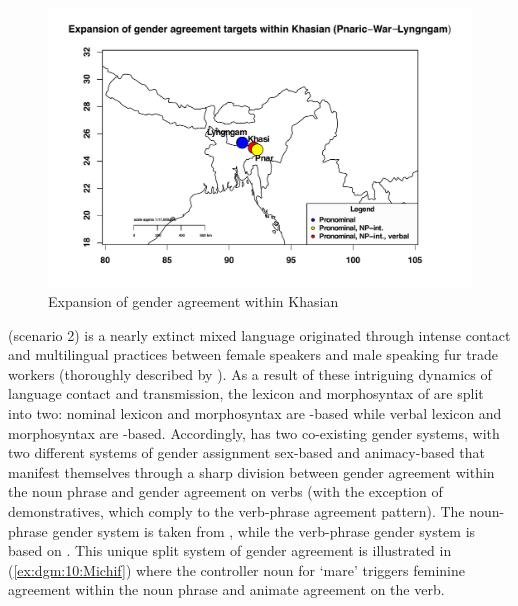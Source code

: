 \documentclass[output=collectionpaper]{langsci/langscibook}
\begin{document}
\begin{figure}
\includegraphics[height=.5\textheight]{figures/11/Khasian2.pdf}
\caption{Expansion of gender agreement within Khasian}
\label{fig:dgm:Khasian1}
\end{figure}


 (scenario 2) is a nearly extinct mixed language originated through intense contact and multilingual practices between female   speakers and male  speaking fur trade workers (thoroughly described by \citealt{Bakker1997}). As a result of these intriguing dynamics of language contact and transmission, the lexicon and morphosyntax of  are split into two: nominal lexicon and morphosyntax are -based while verbal lexicon and morphosyntax are -based. Accordingly,  has two co-existing gender systems, with two different systems of gender assignment \textendash{} sex-based and animacy-based \textendash{} that manifest themselves through a sharp division between gender agreement within the noun phrase and gender agreement on verbs (with the exception of demonstratives, which comply to the verb-phrase agreement pattern). The noun-phrase gender system is taken from , while the verb-phrase gender system is based on . This unique split system of gender agreement is illustrated in (\ref{ex:dgm:10:Michif}) where the controller noun for `mare' triggers feminine agreement within the noun phrase and animate agreement on the verb.
\end{document}
